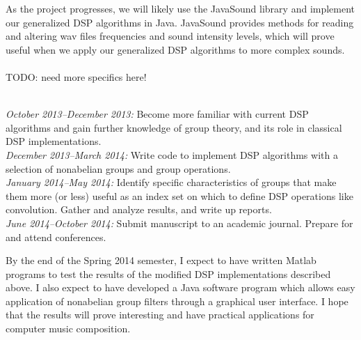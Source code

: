 \documentclass[10pt]{article}
\begin{document}
As the project progresses, we will likely use the JavaSound library and
implement our generalized DSP algorithms in Java.  JavaSound provides methods
for reading and altering wav files frequencies and sound intensity levels, which
will prove useful when we apply our generalized DSP algorithms to more complex
sounds. \\
\\
TODO: need more specifics here!


\vskip5mm

\\
{\it October 2013--December 2013:} Become more familiar with current DSP algorithms
and gain further knowledge of group theory, and its role in classical DSP
implementations. 
\\[5pt]
{\it December 2013--March 2014:} Write code to implement DSP algorithms with a
selection of nonabelian groups and group operations.  
\\[5pt]
{\it January 2014--May 2014:} 
Identify specific characteristics of groups that make them more (or less)
useful as an index set on which to define DSP operations like convolution.
Gather and analyze results, and write up reports.  
\\[5pt]
{\it June 2014--October 2014:} Submit manuscript to an academic journal.  Prepare
for and attend conferences.

\vskip5mm

By the end of the Spring 2014 semester, I expect to have written Matlab programs
to test the results of the modified DSP implementations described above.  I also
expect to have developed a Java software program which allows easy application
of nonabelian group filters through a graphical user interface.  I hope that the
results will prove interesting and have practical applications for computer
music composition.  
\end{document}
